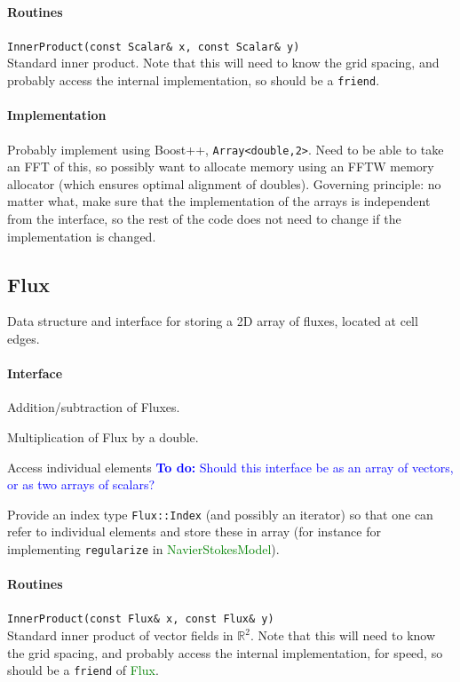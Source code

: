 \documentclass[11pt]{article}
\def\todo#1{\textcolor{blue}{{\bf To do:} #1}}
\def\class#1{\textcolor{green}{\ttfamily\small #1}} %
\let\code\lstinline
\begin{document}
\paragraph{Routines}
\begin{description}
	\item \code|InnerProduct(const Scalar& x, const Scalar& y)|\\
	Standard inner product.  Note that this will need to know the grid spacing, and probably access the internal implementation, so should be a \code|friend|.
\end{description}

\paragraph{Implementation}
Probably implement using Boost++, \code|Array<double,2>|.  Need to be able to take an FFT of this, so possibly want to allocate memory using an FFTW memory allocator (which ensures optimal alignment of doubles).  Governing principle: no matter what, make sure that the implementation of the arrays is independent from the interface, so the rest of the code does not need to change if the implementation is changed.

\subsection{Flux}
Data structure and interface for storing a 2D array of fluxes, located at cell edges.

\paragraph{Interface}
\begin{description}
	\item Addition/subtraction of Fluxes.
	\item Multiplication of Flux by a double.
	\item Access individual elements \todo{Should this interface be as an array of vectors, or as two arrays of scalars?}
	\item Provide an index type \code|Flux::Index| (and possibly an iterator) so that one can refer to individual elements and store these in array (for instance for implementing \code|regularize| in \class{NavierStokesModel}).
\end{description}

\paragraph{Routines}
\begin{description}
	\item \code|InnerProduct(const Flux& x, const Flux& y)|\\
	Standard inner product of vector fields in $\mathbb{R}^2$.  Note that this will need to know the grid spacing, and probably access the internal implementation, for speed, so should be a \code|friend| of \class{Flux}.
\end{description}
\end{document}
